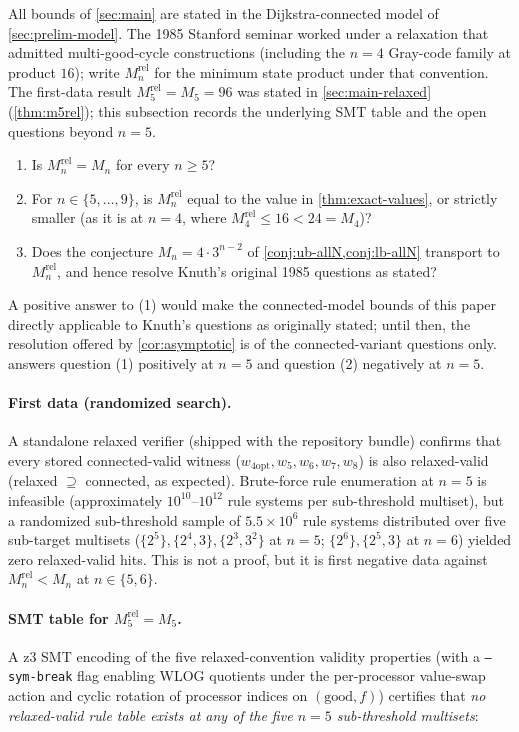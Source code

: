 \documentclass[11pt,a4paper]{article}
\theoremstyle{plain}
\theoremstyle{definition}
\newcommand{\Mn}{M_n}
\begin{document}
All bounds of \cref{sec:main} are stated in the Dijkstra-connected
model of \cref{sec:prelim-model}.  The 1985 Stanford seminar worked
under a relaxation that admitted multi-good-cycle constructions
(including the $n = 4$ Gray-code family at product $16$); write
$\Mn^{\mathrm{rel}}$ for the minimum state product under that
convention.  The first-data result $M_5^{\mathrm{rel}} = M_5 = 96$
was stated in \cref{sec:main-relaxed} (\cref{thm:m5rel}); this
subsection records the underlying SMT table and the open questions
beyond $n = 5$.
\begin{enumerate}[leftmargin=*]
\item Is $\Mn^{\mathrm{rel}} = \Mn$ for every $n \ge 5$?
\item For $n \in \{5, \ldots, 9\}$, is $\Mn^{\mathrm{rel}}$ equal
to the value in \cref{thm:exact-values}, or strictly smaller
(as it is at $n = 4$, where $M_4^{\mathrm{rel}} \le 16 < 24 = M_4$)?
\item Does the conjecture $\Mn = 4 \cdot 3^{n-2}$ of
\cref{conj:ub-allN,conj:lb-allN} transport to $\Mn^{\mathrm{rel}}$,
and hence resolve Knuth's original 1985 questions as stated?
\end{enumerate}
A positive answer to (1) would make the connected-model bounds of
this paper directly applicable to Knuth's questions as originally
stated; until then, the resolution offered by
\cref{cor:asymptotic} is of the connected-variant questions only.
 answers question (1) positively at $n = 5$ and
question (2) negatively at $n = 5$.

\paragraph{First data (randomized search).}  A standalone relaxed
verifier (shipped with the repository bundle) confirms that every
stored connected-valid witness ($w_{4\mathrm{opt}}, w_5, w_6, w_7,
w_8$) is also relaxed-valid (relaxed $\supseteq$ connected, as
expected).  Brute-force rule enumeration at $n = 5$ is infeasible
(approximately $10^{10}$--$10^{12}$ rule systems per sub-threshold
multiset), but a randomized sub-threshold sample of $5.5 \times
10^6$ rule systems distributed over five sub-target multisets
($\{2^5\}, \{2^4,3\}, \{2^3, 3^2\}$ at $n = 5$; $\{2^6\}, \{2^5, 3\}$
at $n = 6$) yielded zero relaxed-valid hits.  This is not a proof,
but it is first negative data against $M_n^{\mathrm{rel}} < M_n$ at
$n \in \{5, 6\}$.

\paragraph{SMT table for $M_5^{\mathrm{rel}} = M_5$.}  A z3 SMT
encoding of the five relaxed-convention validity properties (with a
\texttt{--sym-break} flag enabling WLOG quotients under the
per-processor value-swap action and cyclic rotation of processor
indices on $(\mathrm{good}, f)$) certifies that \emph{no
relaxed-valid rule table exists at any of the five $n = 5$
sub-threshold multisets}:
\end{document}
